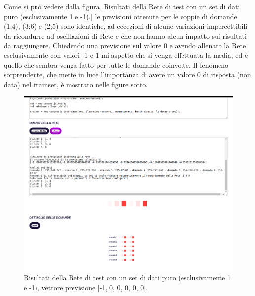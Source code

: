 	\noindent
Come si pu\`o vedere dalla figura \ref{Risultati della Rete di test con un set di dati puro (esclusivamente 1 e -1).} le previsioni ottenute per le coppie di domande (1;4), (3;6) e (2;5) sono identiche, ad eccezioni di alcune variazioni impercettibili da ricondurre ad oscillazioni di Rete e che non hanno alcun impatto sui risultati da raggiungere. Chiedendo una previsione sul valore 0 e avendo allenato la Rete esclusivamente con valori -1 e 1 mi aspetto che si venga effettuata la media, ed \`e quello che sembra venga fatto per tutte le domande coinvolte.
Il fenomeno sorprendente, che mette in luce l'importanza di avere un valore 0 di risposta (non data) nel trainset, \`e mostrato nelle figure sotto.

\begin{figure}[H]
\centering
	\includegraphics[width=1\linewidth]{./image/RetediProva_generatorinputpuro.png}
	\caption{Risultati della Rete di test con un set di dati puro (esclusivamente 1 e -1), vettore previsione [-1, 0, 0, 0, 0, 0].}
	\label{Risultati della Rete di test con un set di dati puro (esclusivamente 1 e -1), vettore previsione [-1, 0, 0, 0, 0, 0].}
\end{figure}
\noindent

